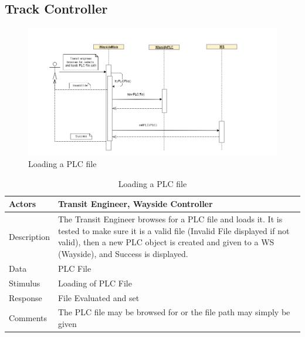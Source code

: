 \documentclass[]{article}
\begin{document}
\subsection{Track Controller}
	\begin{figure}[H]
		\centering
		\includegraphics[scale=.5]{seq_wayside_loadplc.png}
		\caption{Loading a PLC file}
	\end{figure}
	\begin{table}[H]
		\centering
		\caption{Loading a PLC file}
		\begin{tabular}{|l|l|}
			\hline
			Actors & \parbox[t]{10cm}{Transit Engineer, Wayside Controller} \\ \hline
			Description & \parbox[t]{10cm}{The Transit Engineer browses for a PLC file and loads it. It is tested to make sure it is a valid file (Invalid File displayed if not valid), then a new PLC object is created and given to a WS (Wayside), and Success is displayed. } \\ \hline
			Data &  \parbox[t]{10cm}{PLC File} \\ \hline
			Stimulus &  \parbox[t]{10cm}{Loading of PLC File} \\ \hline
			Response & \parbox[t]{10cm}{File Evaluated and set}\\ \hline
			Comments & \parbox[t]{10cm}{The PLC file may be browsed for or the file path may simply be given}  \\ \hline
		\end{tabular}
	\end{table}
	
\end{document}
